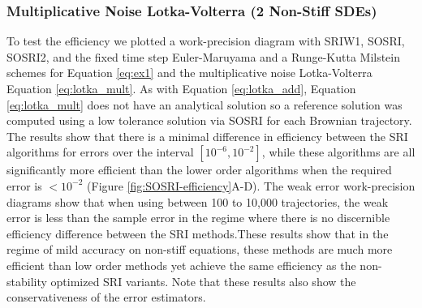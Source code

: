 \documentclass{article}
\begin{document}
\subsubsection{Multiplicative Noise Lotka-Volterra (2 Non-Stiff SDEs)}

To test the efficiency we plotted a work-precision diagram with SRIW1,
SOSRI, SOSRI2, and the fixed time step Euler-Maruyama and a Runge-Kutta
Milstein schemes for Equation \ref{eq:ex1} and the multiplicative
noise Lotka-Volterra Equation \ref{eq:lotka_mult}. As with Equation
\ref{eq:lotka_add}, Equation \ref{eq:lotka_mult} does not have an
analytical solution so a reference solution was computed using a low
tolerance solution via SOSRI for each Brownian trajectory. The results
show that there is a minimal difference in efficiency between the
SRI algorithms for errors over the interval $\left[10^{-6},10^{-2}\right]$,
while these algorithms are all significantly more efficient than the
lower order algorithms when the required error is $<10^{-2}$ (Figure
\ref{fig:SOSRI-efficiency}A-D). The weak error work-precision diagrams
show that when using between 100 to 10,000 trajectories, the weak
error is less than the sample error in the regime where there is no
discernible efficiency difference between the SRI methods.These results
show that in the regime of mild accuracy on non-stiff equations, these
methods are much more efficient than low order methods yet achieve
the same efficiency as the non-stability optimized SRI variants. Note
that these results also show the conservativeness of the error estimators.
\end{document}
